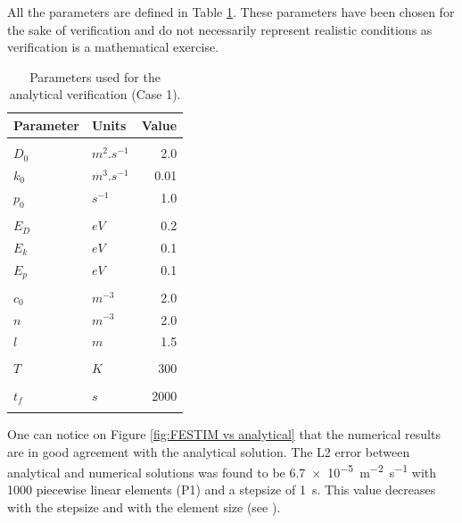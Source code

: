 All the parameters are defined in Table \ref{tab:parameters analytical verification}.
These parameters have been chosen for the sake of verification and do not necessarily represent realistic conditions as verification is a mathematical exercise.
\begin{table}
    \centering
    \begin{tabular}{p{2.3cm} p{2cm} r}
        Parameter & Units & Value \\
        \hline
        \\
        $D_0$ & $\si{m^2.s^{-1}}$ & 2.0 \\
        $k_0$ & $\si{m^3.s^{-1}}$ & 0.01 \\
        $p_0$ & $\si{s^{-1}}$ & 1.0 \\
        \\
        $E_D$ & $\si{eV}$ & 0.2 \\
        $E_k$ & $\si{eV}$ & 0.1 \\
        $E_p$ & $\si{eV}$ & 0.1 \\
        \\
        $c_0$ & $\si{m^{-3}}$ & 2.0 \\
        $n$ & $\si{m^{-3}}$ & 2.0 \\
        $l$ & $\si{m}$ & 1.5\\
        \\
        $T$ & $\si{K}$ & 300 \\
        \\
        $t_f$ & $\si{s}$ & 2000 \\
        \\
    \end{tabular}
    \caption{Parameters used for the analytical verification (Case 1).}
    \label{tab:parameters analytical verification}
\end{table}
One can notice on Figure \ref{fig:FESTIM vs analytical} that the numerical results are in good agreement with the analytical solution.
The L2 error between analytical and numerical solutions was found to be \SI{6.7e-5}{m^{-2}.s^{-1}} with 1000 piecewise linear elements (P1) and a stepsize of \SI{1}{s}.
This value decreases with the stepsize and with the element size (see ).
